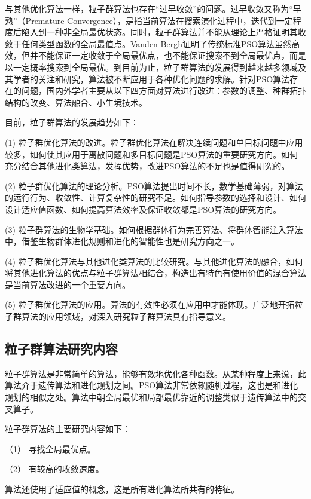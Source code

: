 与其他优化算法一样，粒子群算法也存在“过早收敛”的问题。过早收敛又称为“早熟”（Premature Convergence），是指当前算法在搜索演化过程中，迭代到一定程度后陷入到一种非全局最优状态。同时，粒子群算法并不能从理论上严格证明其收敛于任何类型函数的全局最值点。Vanden Bergh证明了传统标准PSO算法虽然高效，但并不能保证一定收敛于全局最优点，也不能保证搜索不到全局最优点，而是以一定概率搜索到全局最优。到目前为止，粒子群算法的发展得到越来越多领域及其学者的关注和研究，算法被不断应用于各种优化问题的求解。针对PSO算法存在的问题，国内外学者主要从以下四方面对算法进行改进：参数的调整、种群拓扑结构的改变、算法融合、小生境技术。

目前，粒子群算法的发展趋势如下：


	\noindent (1) 粒子群优化算法的改进。粒子群优化算法在解决连续问题和单目标问题中应用较多，如何使其应用于离散问题和多目标问题是PSO算法的重要研究方向。如何充分结合其他进化类算法，发挥优势，改进PSO算法的不足也是值得研究的。
	
	\noindent (2) 粒子群优化算法的理论分析。PSO算法提出时间不长，数学基础薄弱，对算法的运行行为、收敛性、计算复杂性的研究不足。如何指导参数的选择和设计、如何设计适应值函数、如何提高算法效率及保证收敛都是PSO算法的研究方向。
	
	\noindent (3) 粒子群算法的生物学基础。如何根据群体行为完善算法、将群体智能注入算法中，借鉴生物群体进化规则和进化的智能性也是研究方向之一。
	
	\noindent (4) 粒子群优化算法与其他进化类算法的比较研究。与其他进化算法的融合，如何将其他进化算法的优点与粒子群算法相结合，构造出有特色有使用价值的混合算法是当前算法改进的一个重要方向。
	
	\noindent (5) 粒子群优化算法的应用。算法的有效性必须在应用中才能体现。广泛地开拓粒子群算法的应用领域，对深入研究粒子群算法具有指导意义。

	
\subsection{粒子群算法研究内容}
粒子群算法是非常简单的算法，能够有效地优化各种函数。从某种程度上来说，此算法介于遗传算法和进化规划之间。PSO算法非常依赖随机过程，这也是和进化规划的相似之处。算法中朝全局最优和局部最优靠近的调整类似于遗传算法中的交叉算子。

\noindent 粒子群算法的主要研究内容如下：

（1）	寻找全局最优点。

（2）	有较高的收敛速度。

算法还使用了适应值的概念，这是所有进化算法所共有的特征。

